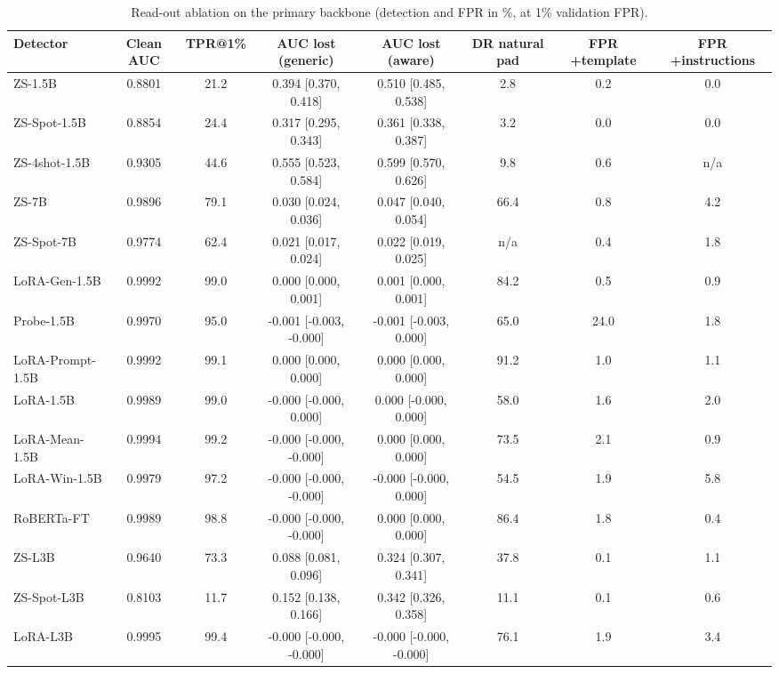 \begin{table}[t]
\centering
\caption{Read-out ablation on the primary backbone (detection and FPR in \%, at 1\% validation FPR).}
\label{tab:ablation}
\footnotesize
\begin{tabular}{lccccccc}
\toprule
\textbf{Detector} & \textbf{Clean AUC} & \textbf{TPR@1\%} & \textbf{AUC lost (generic)} & \textbf{AUC lost (aware)} & \textbf{DR natural pad} & \textbf{FPR +template} & \textbf{FPR +instructions} \\
\midrule
ZS-1.5B & 0.8801 & 21.2 & 0.394 [0.370, 0.418] & 0.510 [0.485, 0.538] & 2.8 & 0.2 & 0.0 \\
ZS-Spot-1.5B & 0.8854 & 24.4 & 0.317 [0.295, 0.343] & 0.361 [0.338, 0.387] & 3.2 & 0.0 & 0.0 \\
ZS-4shot-1.5B & 0.9305 & 44.6 & 0.555 [0.523, 0.584] & 0.599 [0.570, 0.626] & 9.8 & 0.6 & n/a \\
ZS-7B & 0.9896 & 79.1 & 0.030 [0.024, 0.036] & 0.047 [0.040, 0.054] & 66.4 & 0.8 & 4.2 \\
ZS-Spot-7B & 0.9774 & 62.4 & 0.021 [0.017, 0.024] & 0.022 [0.019, 0.025] & n/a & 0.4 & 1.8 \\
LoRA-Gen-1.5B & 0.9992 & 99.0 & 0.000 [0.000, 0.001] & 0.001 [0.000, 0.001] & 84.2 & 0.5 & 0.9 \\
Probe-1.5B & 0.9970 & 95.0 & -0.001 [-0.003, -0.000] & -0.001 [-0.003, 0.000] & 65.0 & 24.0 & 1.8 \\
LoRA-Prompt-1.5B & 0.9992 & 99.1 & 0.000 [0.000, 0.000] & 0.000 [0.000, 0.000] & 91.2 & 1.0 & 1.1 \\
LoRA-1.5B & 0.9989 & 99.0 & -0.000 [-0.000, 0.000] & 0.000 [-0.000, 0.000] & 58.0 & 1.6 & 2.0 \\
LoRA-Mean-1.5B & 0.9994 & 99.2 & -0.000 [-0.000, -0.000] & 0.000 [0.000, 0.000] & 73.5 & 2.1 & 0.9 \\
LoRA-Win-1.5B & 0.9979 & 97.2 & -0.000 [-0.000, -0.000] & -0.000 [-0.000, 0.000] & 54.5 & 1.9 & 5.8 \\
RoBERTa-FT & 0.9989 & 98.8 & -0.000 [-0.000, -0.000] & 0.000 [0.000, 0.000] & 86.4 & 1.8 & 0.4 \\
ZS-L3B & 0.9640 & 73.3 & 0.088 [0.081, 0.096] & 0.324 [0.307, 0.341] & 37.8 & 0.1 & 1.1 \\
ZS-Spot-L3B & 0.8103 & 11.7 & 0.152 [0.138, 0.166] & 0.342 [0.326, 0.358] & 11.1 & 0.1 & 0.6 \\
LoRA-L3B & 0.9995 & 99.4 & -0.000 [-0.000, -0.000] & -0.000 [-0.000, -0.000] & 76.1 & 1.9 & 3.4 \\
\bottomrule
\end{tabular}
\end{table}